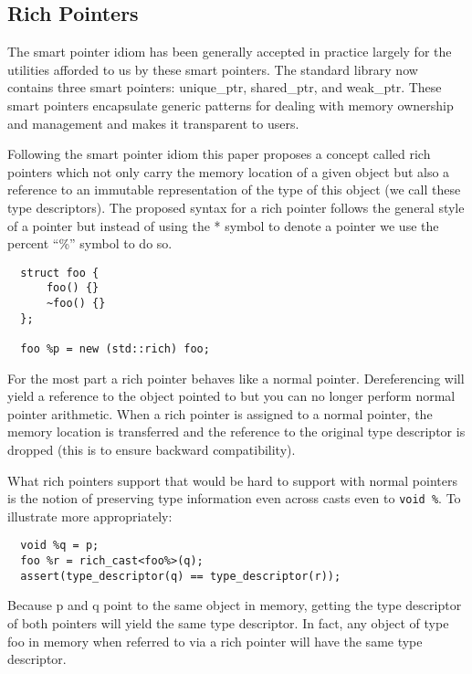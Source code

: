 \subsection{Rich Pointers}

The smart pointer idiom has been generally accepted in practice largely for the
utilities afforded to us by these smart pointers. The standard library now
contains three smart pointers: unique\_ptr, shared\_ptr, and weak\_ptr. These
smart pointers encapsulate generic patterns for dealing with memory ownership
and management and makes it transparent to users.

Following the smart pointer idiom this paper proposes a concept called rich
pointers which not only carry the memory location of a given object but also a
reference to an immutable representation of the type of this object (we call
these type descriptors). The proposed syntax for a rich pointer follows the
general style of a pointer but instead of using the * symbol to denote a pointer
we use the percent ``\%'' symbol to do so.

\begin{verbatim}
  struct foo {
      foo() {}
      ~foo() {}
  };

  foo %p = new (std::rich) foo;
\end{verbatim}

For the most part a rich pointer behaves like a normal pointer. Dereferencing
will yield a reference to the object pointed to but you can no longer perform
normal pointer arithmetic. When a rich pointer is assigned to a normal pointer,
the memory location is transferred and the reference to the original type
descriptor is dropped (this is to ensure backward compatibility).

What rich pointers support that would be hard to support with normal pointers is
the notion of preserving type information even across casts even to
\verb+void %+. To illustrate more appropriately:

\begin{verbatim}
  void %q = p;
  foo %r = rich_cast<foo%>(q);
  assert(type_descriptor(q) == type_descriptor(r));
\end{verbatim}

Because p and q point to the same object in memory, getting the type descriptor
of both pointers will yield the same type descriptor. In fact, any object of
type foo in memory when referred to via a rich pointer will have the same type
descriptor.



